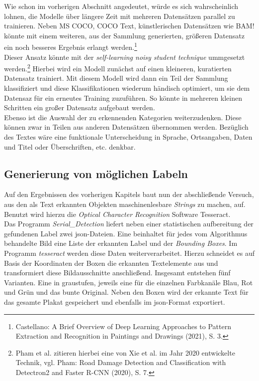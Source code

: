 \documentclass[a4paper,12pt,ngerman]{article}
\begin{document}
Wie schon im vorherigen Abschnitt angedeutet, würde es sich wahrscheinlich lohnen, die Modelle über längere Zeit mit mehreren Datensätzen parallel zu trainieren. Neben MS COCO, COCO Text, künstlerischen Datensätzen wie BAM! könnte mit einem weiteren, aus der Sammlung generierten, größeren Datensatz ein noch besseres Ergebnis erlangt werden.\footnote{Castellano: A Brief Overview of Deep Learning Approaches to Pattern Extraction and Recognition in Paintings and Drawings (2021), S. 3.} \\
Dieser Ansatz könnte mit der \textit{self-learning noisy student technique} ummgesetzt werden.\footnote{Pham et al. zitieren hierbei eine von Xie et al. im Jahr 2020 entwickelte Technik, vgl. Pham: Road Damage Detection and Classification with Detectron2 and Faster R-CNN (2020), S. 7.} Hierbei wird ein Modell zunächst auf einen kleineren, kuratierten Datensatz trainiert. Mit diesem Modell wird dann ein Teil der Sammlung klassifiziert und diese Klassifikationen wiederum händisch optimiert, um sie dem Datensaz für ein erneutes Training zuzuführen. So könnte in mehreren kleinen Schritten ein großer Datensatz aufgebaut werden. \\
Ebenso ist die Auswahl der zu erkennenden Kategorien weiterzudenken. Diese können zwar in Teilen aus anderen Datensätzen übernommen werden. Bezüglich des Textes wäre eine funktionale Unterscheidung in Sprache, Ortsangaben, Daten und Titel oder Überschriften, etc. denkbar.

\subsection{Generierung von möglichen Labeln}

Auf den Ergebnissen des vorherigen Kapitels baut nun der abschließende Versuch, aus den als Text erkannten Objekten maschinenlesbare \textit{Strings} zu machen, auf. Benutzt wird hierzu die \textit{Optical Character Recognition} Software Tesseract. \\

Das Programm \textit{Serial\_Detection} liefert neben einer statistischen aufbereitung der gefundenen Label zwei json-Dateien. Eine beinhaltet für jedes vom Algorithmus behandelte Bild eine Liste der erkannten Label und der \textit{Bounding Boxes}. Im Programm \textit{tesseract} werden diese Daten weiterverarbeitet. Hierzu schneidet es auf Basis der Koordinaten der Boxen die erkannten Textelemente aus und transformiert diese Bildausschnitte anschließend. Insgesamt entstehen fünf Varianten. Eine in graustufen, jeweils eine für die einzelnen Farbkanäle Blau, Rot und Grün und das bunte Original. Neben den Boxen wird der erkannte Text für das gesamte Plakat gespeichert und ebenfalls im json-Format exportiert.
\end{document}
